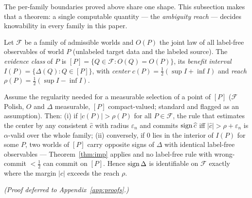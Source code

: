 
The per-family boundaries proved above share one shape. This subsection makes that a
theorem: a single computable quantity --- the \emph{ambiguity reach} --- decides
knowability in every family in this paper.

\begin{definition}\label{def:reach}
Let $\mathcal F$ be a family of admissible worlds and $O(P)$ the joint law of all
label-free observables of world $P$ (unlabeled target data and the labeled source).
The \emph{evidence class} of $P$ is $[P]=\{Q\in\mathcal F: O(Q)=O(P)\}$, its
\emph{benefit interval} $I(P)=\{\Delta(Q):Q\in[P]\}$, with \emph{center}
$c(P)=\tfrac12(\sup I+\inf I)$ and \emph{reach} $\rho(P)=\tfrac12(\sup I-\inf I)$.
\end{definition}

\begin{theorem}[Knowability $=$ margin beyond reach]\label{thm:unify}
Assume the regularity needed for a measurable selection of a point of $[P]$
($\mathcal F$ Polish, $O$ and $\Delta$ measurable, $[P]$ compact-valued; standard and
flagged as an assumption). Then:
\textup{(i)} if $|c(P)|>\rho(P)$ for all $P\in\mathcal F$, the rule that estimates the
center by any consistent $\widehat c$ with radius $\varepsilon_n$ and commits
$\operatorname{sign}\widehat c$ iff $|\widehat c|>\rho+\varepsilon_n$ is $\alpha$-valid over the whole
family;
\textup{(ii)} conversely, if $0$ lies in the interior of $I(P)$ for some $P$, two worlds
of $[P]$ carry opposite signs of $\Delta$ with identical label-free observables ---
Theorem~\ref{thm:imp} applies and no label-free rule with wrong-commit
$<\tfrac12$ can commit on $[P]$.
Hence $\operatorname{sign}\Delta$ is identifiable on $\mathcal F$ exactly where the margin $|c|$
exceeds the reach $\rho$.
\end{theorem}
\emph{(Proof deferred to Appendix~\ref{app:proofs}.)}

